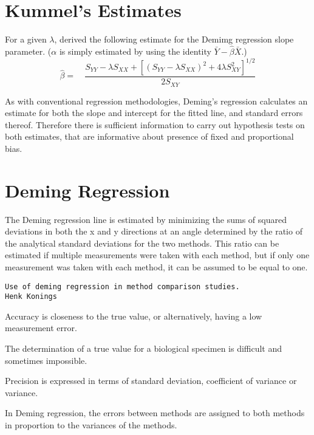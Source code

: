 \documentclass[12pt, a4paper]{report}
\theoremstyle{plain}
\theoremstyle{definition}
\theoremstyle{remark}
\begin{document}

\section{Kummel's Estimates}
For a given $\lambda$, \citet{Kummel} derived the following
estimate for the Demimg regression slope parameter. ($\alpha$ is
simply estimated by using the identity
$\bar{Y}-\hat{\beta}\bar{X}$.)
\begin{equation}
	\hat{\beta} =\quad \frac{S_{YY} - \lambda S_{XX}+[(S_{YY} -
		\lambda S_{XX})^{2}+ 4\lambda S^{2}_{XY}]^{1/2}}{2S_{XY}}
\end{equation}


As with conventional regression methodologies, Deming's regression
calculates an estimate for both the slope and intercept for the
fitted line, and standard errors thereof. Therefore there is
sufficient information to carry out hypothesis tests on both
estimates, that are informative about presence of fixed and
proportional bias.
\section{Deming Regression}



The Deming regression line is estimated by minimizing the sums of squared deviations in both the x and y directions at an angle determined by the ratio of the analytical standard deviations for the two methods.
This ratio can be estimated if multiple measurements were taken with each method, but if only one measurement was taken with each method, it can be assumed to be equal to one.


\begin{verbatim}
Use of deming regression in method comparison studies.
Henk Konings
\end{verbatim}

Accuracy is closeness to the true value, or alternatively, having a low measurement error.

The determination of a true value for a biological specimen is difficult and sometimes impossible.

Precision is expressed in terms of standard deviation, coefficient of variance or variance.

In Deming regression, the errors between methods are assigned to both methods in proportion to the variances of the methods.
\end{document}
